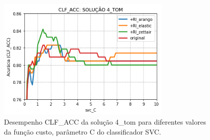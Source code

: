 \begin{figure}[h]
    \centering
    \caption{Desempenho CLF\_ACC da solução 4\_tom para diferentes valores da função custo, parâmetro C do classificador SVC.}
    \begin{center}
        \includegraphics[width=0.75\textwidth]{img/clf-acc-4-tom.png}
    \end{center}
    \vspace{-0.5cm}
    \label{fig:clf-acc-4-tom}
\end{figure}